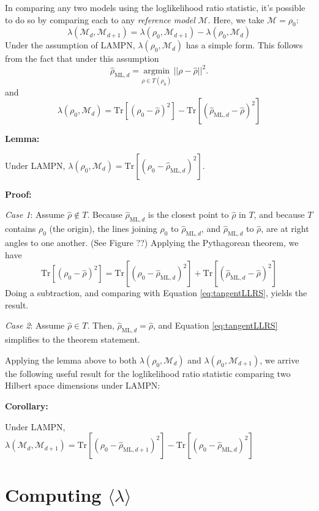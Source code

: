 \documentclass[aps,pra, twocolumn]{revtex4-1}
\newcommand{\M}{\mathcal{M}}
\newcommand{\rhohat}{\hat{\rho}}
\newcommand{\rhoML}[1]{\rhohat_{\scriptscriptstyle{\mathrm{ML},#1}}}
\begin{document}
In comparing any two models using the loglikelihood ratio statistic, it's possible to do so by comparing each to any \emph{reference model} $\M$. Here, we take $\M = \rho_{0}$:
\[\lambda(\M_{d}, \M_{d+1}) = \lambda(\rho_{0},\M_{d+1}) - \lambda(\rho_{0},\M_{d})\]
Under the assumption of LAMPN, $\lambda(\rho_{0}, \M_{d})$ has a simple form. This follows from the fact that under this assumption
\[\rhoML{d} = \underset{\rho \in T(\rho_{0})}{\text{argmin}}~||\rho  -\hat{\rho}||^{2}.\]
and
\begin{equation}
\label{eq:tangentLLRS}
\lambda(\rho_{0}, \M_{d}) = \mathrm{Tr}[(\rho_{0} -\hat{\rho})^{2}] -   \mathrm{Tr}[(\rhoML{d} - \hat{\rho})^{2}]
\end{equation}

\textbf{Lemma:}

Under LAMPN, $\lambda(\rho_{0}, \M_{d}) = \mathrm{Tr}[(\rho_{0} - \rhoML{d})^{2}]$.

\textbf{Proof:}

\emph{Case 1}: Assume $\hat{\rho} \not \in T$. Because $\rhoML{d}$ is the closest point to $\hat{\rho}$ in $T$, and because $T$ contains $\rho_{0}$ (the origin), the lines joining $\rho_{0}$ to $\rhoML{d}$, and $\rhoML{d}$ to $\hat{\rho}$, are at right angles to one another. (See Figure ??) Applying the Pythagorean theorem, we have
\begin{equation}
\label{eq:pythag}
\mathrm{Tr}[(\rho_{0} -\hat{\rho})^{2}] =  \mathrm{Tr}[(\rho_{0} - \rhoML{d})^{2}] + \mathrm{Tr}[(\rhoML{d} - \hat{\rho})^{2}]
\end{equation}
Doing a subtraction, and comparing with Equation \eqref{eq:tangentLLRS}, yields the result.

\emph{Case 2}: Assume $\hat{\rho} \in T$. Then, $\rhoML{d}= \hat{\rho}$, and Equation \eqref{eq:tangentLLRS} simplifies to the theorem statement.


Applying the lemma above to both $\lambda(\rho_{0},\M_{d})$ and $\lambda(\rho_{0},\M_{d+1})$, we arrive the following useful result for the loglikelihood ratio statistic comparing two Hilbert space dimensions under LAMPN:

\textbf{Corollary:}

Under LAMPN, $\lambda(\M_{d}, \M_{d+1}) = \mathrm{Tr}[(\rho_{0} - \rhoML{d+1})^{2}] -\mathrm{Tr}[(\rho_{0} - \rhoML{d})^{2}]$




\section{Computing $\langle \lambda \rangle$}
\end{document}
